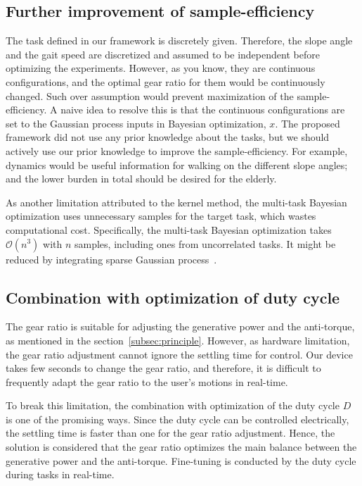 \documentclass[twocolumn]{svjour3}          %
\begin{document}
\subsection{Further improvement of sample-efficiency}
\label{subsec:discuss_efficiency}

The task defined in our framework is discretely given.
Therefore, the slope angle and the gait speed are discretized and assumed to be independent before optimizing the experiments.
However, as you know, they are continuous configurations, and the optimal gear ratio for them would be continuously changed.
Such over assumption would prevent maximization of the sample-efficiency.
A naive idea to resolve this is that the continuous configurations are set to the Gaussian process inputs in Bayesian optimization, $x$.
The proposed framework did not use any prior knowledge about the tasks, but we should actively use our prior knowledge to improve the sample-efficiency.
For example, dynamics would be useful information for walking on the different slope angles; and the lower burden in total should be desired for the elderly.

As another limitation attributed to the kernel method, the multi-task Bayesian optimization uses unnecessary samples for the target task, which wastes computational cost.
Specifically, the multi-task Bayesian optimization takes $\mathcal{O}(n^3)$ with $n$ samples, including ones from uncorrelated tasks. It might be reduced by integrating sparse Gaussian process~\cite{snelson2006sparse}.

\subsection{Combination with optimization of duty cycle}

The gear ratio is suitable for adjusting the generative power and the anti-torque, as mentioned in the section~\ref{subsec:principle}.
However, as hardware limitation, the gear ratio adjustment cannot ignore the settling time for control.
Our device takes few seconds to change the gear ratio, and therefore, it is difficult to frequently adapt the gear ratio to the user's motions in real-time.

To break this limitation, the combination with optimization of the duty cycle $D$ is one of the promising ways.
Since the duty cycle can be controlled electrically, the settling time is faster than one for the gear ratio adjustment.
Hence, the solution is considered that the gear ratio optimizes the main balance between the generative power and the anti-torque. Fine-tuning is conducted by the duty cycle during tasks in real-time.
\end{document}
